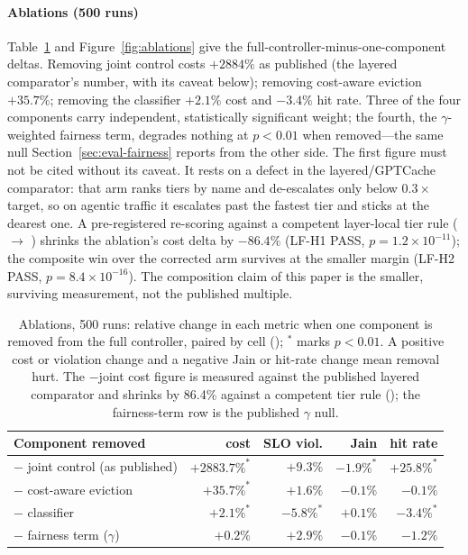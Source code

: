 \paragraph{Ablations (500 runs)} Table~\ref{tab:ablations} and
Figure~\ref{fig:ablations} give the full-controller-minus-one-component
deltas. Removing joint control costs $+2884\%$ as published (the layered
comparator's number, with its caveat below); removing cost-aware eviction
$+35.7\%$; removing the classifier $+2.1\%$ cost and $-3.4\%$ hit rate.
Three of the four components carry
independent, statistically significant weight; the fourth, the
$\gamma$-weighted fairness term, degrades nothing at $p < 0.01$ when
removed---the same null Section~\ref{sec:eval-fairness} reports from the
other side. The first figure must not be cited without its caveat. It
rests on a defect in the layered/GPTCache
comparator: that arm ranks tiers by name and de-escalates only below
$0.3\times$ target, so on agentic traffic it escalates past the fastest
tier and sticks at the dearest one. A pre-registered re-scoring against a
competent layer-local tier rule (
$\to$ ) shrinks the ablation's cost delta
by $-86.4\%$ (LF-H1 PASS, $p = 1.2{\times}10^{-11}$); the composite win
over the corrected arm survives at the smaller margin (LF-H2 PASS, $p =
8.4{\times}10^{-16}$). The composition claim of this paper is the smaller,
surviving measurement, not the published multiple.

\begin{table}[htbp]
\centering\tablefontsmall\setlength{\tabcolsep}{5pt}
\begin{tabular}{@{}lrrrr@{}}
\toprule
\textbf{Component removed} & \textbf{cost} & \textbf{SLO viol.} & \textbf{Jain} & \textbf{hit rate} \\
\midrule
$-$ joint control (as published) & $+2883.7\%^{*}$ & $+9.3\%$ & $-1.9\%^{*}$ & $+25.8\%^{*}$ \\
$-$ cost-aware eviction          & $+35.7\%^{*}$   & $+1.6\%$ & $-0.1\%$      & $-0.1\%$ \\
$-$ classifier                   & $+2.1\%^{*}$    & $-5.8\%^{*}$ & $+0.1\%$  & $-3.4\%^{*}$ \\
$-$ fairness term ($\gamma$)     & $+0.2\%$        & $+2.9\%$ & $-0.1\%$      & $-1.2\%$ \\
\bottomrule
\end{tabular}
\caption{Ablations, 500 runs: relative change in each metric when one
component is removed from the full controller, paired by cell
(); $^{*}$ marks $p < 0.01$. A positive cost or
violation change and a negative Jain or hit-rate change mean removal
hurt. The $-$joint cost figure is measured against the published layered
comparator and shrinks by 86.4\% against a competent tier rule
(); the fairness-term row is the published
$\gamma$ null.}
\label{tab:ablations}
\end{table}

